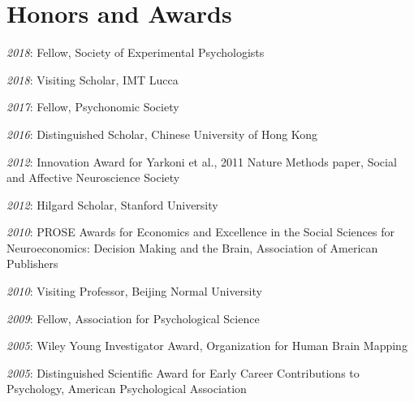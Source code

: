 \section*{Honors and Awards}
\noindent

\textit{2018}: Fellow, Society of Experimental Psychologists

\textit{2018}: Visiting Scholar, IMT Lucca

\textit{2017}: Fellow, Psychonomic Society

\textit{2016}: Distinguished Scholar, Chinese University of Hong Kong

\textit{2012}: Innovation Award for Yarkoni et al., 2011 Nature Methods paper, Social and Affective Neuroscience Society

\textit{2012}: Hilgard Scholar, Stanford University

\textit{2010}: PROSE Awards for Economics and Excellence in the Social Sciences for Neuroeconomics: Decision Making and the Brain, Association of American Publishers

\textit{2010}: Visiting Professor, Beijing Normal University

\textit{2009}: Fellow, Association for Psychological Science

\textit{2005}: Wiley Young Investigator Award, Organization for Human Brain Mapping

\textit{2005}: Distinguished Scientific Award for Early Career Contributions to Psychology, American Psychological Association

